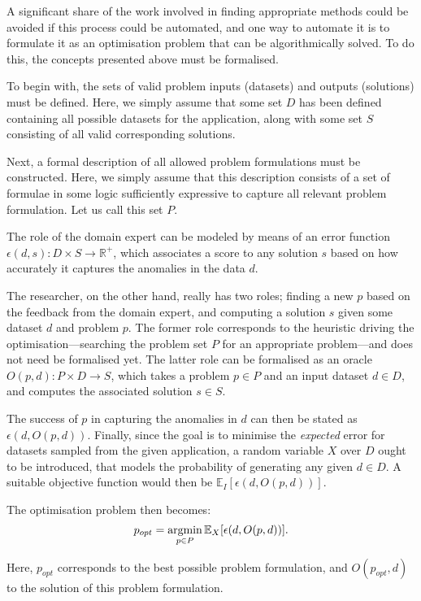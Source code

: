 A significant share of the work involved in finding appropriate methods could be avoided if this process could be automated, and one way to automate it is to formulate it as an optimisation problem that can be algorithmically solved. To do this, the concepts presented above must be formalised.

To begin with, the sets of valid problem inputs (datasets) and outputs (solutions) must be defined. Here, we simply assume that some set $D$ has been defined containing all possible datasets for the application, along with some set $S$ consisting of all valid corresponding solutions.

Next, a formal description of all allowed problem formulations must be constructed. Here, we simply assume that this description consists of a set of formulae in some logic sufficiently expressive to capture all relevant problem formulation. Let us call this set $P$.

The role of the domain expert can be modeled by means of an error function $\epsilon(d, s): D \times S \rightarrow \mathbb{R}^+$, which associates a score to any solution $s$ based on how accurately it captures the anomalies in the data $d$.

The researcher, on the other hand, really has two roles; finding a new $p$ based on the feedback from the domain expert, and computing a solution $s$ given some dataset $d$ and problem $p$. The former role corresponds to the heuristic driving the optimisation---searching the problem set $P$ for an appropriate problem---and does not need be formalised yet. The latter role can be formalised as an oracle $O(p, d): P \times D \rightarrow S$, which takes a problem $p \in P$ and an input dataset $d \in D$, and computes the associated solution $s \in S$.

The success of $p$ in capturing the anomalies in $d$ can then be stated as $\epsilon(d, O(p, d))$. Finally, since the goal is to minimise the \emph{expected} error for datasets sampled from the given application, a random variable $X$ over $D$ ought to be introduced, that models the probability of generating any given $d \in D$. A suitable objective function would then be $\mathbb{E}_I [\epsilon(d, O(p, d))]$.

The optimisation problem then becomes:
\[
    p_{opt} = \argmin_{p \in P}\mathbb{E}_X [ \epsilon(d, O(p, d)) ].
\]

Here, $p_{opt}$ corresponds to the best possible problem formulation, and $O(p_{opt}, d)$ to the solution of this problem formulation.

